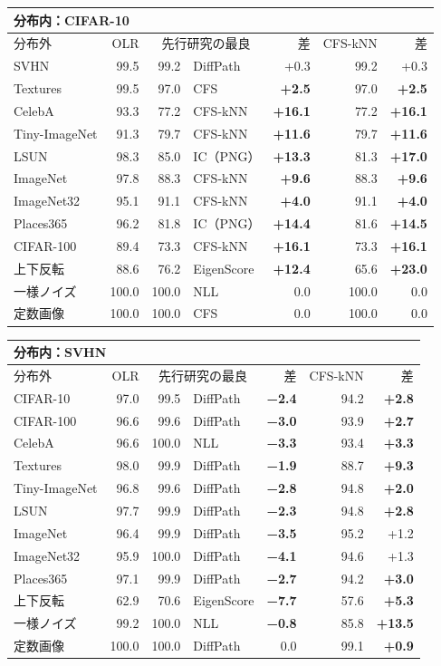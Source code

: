 \documentclass[border=3pt]{standalone}
\newcommand{\R}[1]{\textcolor{tred}{#1}}
\newcommand{\B}[1]{\textcolor{tnavy}{\textbf{#1}}}
\begin{document}
%
\begin{tabular}[t]{lrrlrrr}
\toprule
\multicolumn{7}{l}{分布内：CIFAR-10}\\
\midrule
分布外 & OLR & \multicolumn{2}{c}{先行研究の最良} & 差 & CFS-kNN & 差\\
\midrule
SVHN & 99.5 & 99.2 & DiffPath & +0.3 & 99.2 & +0.3\\
Textures & 99.5 & 97.0 & CFS & \B{+2.5} & 97.0 & \B{+2.5}\\
CelebA & 93.3 & 77.2 & CFS-kNN & \B{+16.1} & 77.2 & \B{+16.1}\\
Tiny-ImageNet & 91.3 & 79.7 & CFS-kNN & \B{+11.6} & 79.7 & \B{+11.6}\\
LSUN & 98.3 & 85.0 & IC（PNG） & \B{+13.3} & 81.3 & \B{+17.0}\\
ImageNet & 97.8 & 88.3 & CFS-kNN & \B{+9.6} & 88.3 & \B{+9.6}\\
ImageNet32 & 95.1 & 91.1 & CFS-kNN & \B{+4.0} & 91.1 & \B{+4.0}\\
Places365 & 96.2 & 81.8 & IC（PNG） & \B{+14.4} & 81.6 & \B{+14.5}\\
CIFAR-100 & 89.4 & 73.3 & CFS-kNN & \B{+16.1} & 73.3 & \B{+16.1}\\
上下反転 & 88.6 & 76.2 & EigenScore & \B{+12.4} & 65.6 & \B{+23.0}\\
一様ノイズ & 100.0 & 100.0 & NLL & 0.0 & 100.0 & 0.0\\
定数画像 & 100.0 & 100.0 & CFS & 0.0 & 100.0 & 0.0\\
\bottomrule
\end{tabular}%
\hspace{14pt}%
\begin{tabular}[t]{lrrlrrr}
\toprule
\multicolumn{7}{l}{分布内：SVHN}\\
\midrule
分布外 & OLR & \multicolumn{2}{c}{先行研究の最良} & 差 & CFS-kNN & 差\\
\midrule
CIFAR-10 & 97.0 & 99.5 & DiffPath & \R{\textbf{−2.4}} & 94.2 & \B{+2.8}\\
CIFAR-100 & 96.6 & 99.6 & DiffPath & \R{\textbf{−3.0}} & 93.9 & \B{+2.7}\\
CelebA & 96.6 & 100.0 & NLL & \R{\textbf{−3.3}} & 93.4 & \B{+3.3}\\
Textures & 98.0 & 99.9 & DiffPath & \R{\textbf{−1.9}} & 88.7 & \B{+9.3}\\
Tiny-ImageNet & 96.8 & 99.6 & DiffPath & \R{\textbf{−2.8}} & 94.8 & \B{+2.0}\\
LSUN & 97.7 & 99.9 & DiffPath & \R{\textbf{−2.3}} & 94.8 & \B{+2.8}\\
ImageNet & 96.4 & 99.9 & DiffPath & \R{\textbf{−3.5}} & 95.2 & +1.2\\
ImageNet32 & 95.9 & 100.0 & DiffPath & \R{\textbf{−4.1}} & 94.6 & +1.3\\
Places365 & 97.1 & 99.9 & DiffPath & \R{\textbf{−2.7}} & 94.2 & \B{+3.0}\\
上下反転 & 62.9 & 70.6 & EigenScore & \R{\textbf{−7.7}} & 57.6 & \B{+5.3}\\
一様ノイズ & 99.2 & 100.0 & NLL & \R{\textbf{−0.8}} & 85.8 & \B{+13.5}\\
定数画像 & 100.0 & 100.0 & DiffPath & 0.0 & 99.1 & \B{+0.9}\\
\bottomrule
\end{tabular}%
\end{document}
